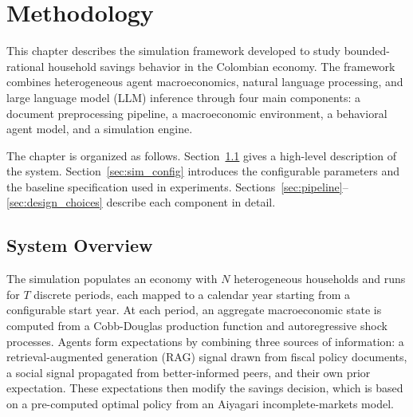 
\chapter{Methodology}
\label{chap:methodology}

This chapter describes the simulation framework developed to study bounded-rational household savings behavior in the Colombian economy. The framework combines heterogeneous agent macroeconomics, natural language processing, and large language model (LLM) inference through four main components: a document preprocessing pipeline, a macroeconomic environment, a behavioral agent model, and a simulation engine.

The chapter is organized as follows. Section~\ref{sec:overview} gives a high-level description of the system. Section~\ref{sec:sim_config} introduces the configurable parameters and the baseline specification used in experiments. Sections~\ref{sec:pipeline}--\ref{sec:design_choices} describe each component in detail.


\section{System Overview}
\label{sec:overview}

The simulation populates an economy with $N$ heterogeneous households and runs for $T$ discrete periods, each mapped to a calendar year starting from a configurable start year. At each period, an aggregate macroeconomic state is computed from a Cobb-Douglas production function and autoregressive shock processes. Agents form expectations by combining three sources of information: a retrieval-augmented generation (RAG) signal drawn from fiscal policy documents, a social signal propagated from better-informed peers, and their own prior expectation. These expectations then modify the savings decision, which is based on a pre-computed optimal policy from an Aiyagari incomplete-markets model.

